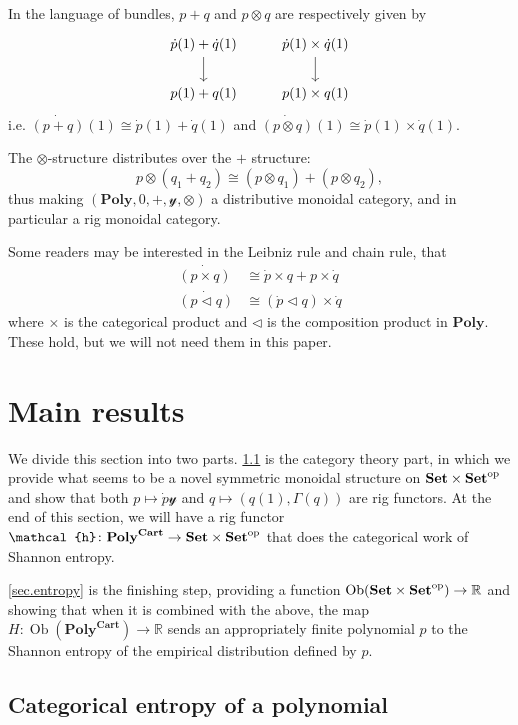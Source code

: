\documentclass[11pt, one side, article]{memoir}
\theoremstyle{definition}
\theoremstyle{plain}
\newenvironment{remark}
  {\pushQED{\qed}\renewcommand{\qedsymbol}{$\lozenge$}\remarkx}
  {\popQED\endremarkx}
\DeclareMathOperator{\ob}{Ob}
\newcommand{\Cat}[1]{\mathbf{#1}}%
\newcommand{\op}{^\tn{op}}
\newcommand{\tn}[1]{\textnormal{#1}}
\newcommand{\rr}{\mathbb{R}}
\newcommand{\smset}{\Cat{Set}}
\newcommand{\yon}{\mathcal{y}}
\newcommand{\poly}{\Cat{Poly}}
\newcommand{\polycart}{\poly^{\Cat{Cart}}}
\newcommand{\hh}{\mathcal{h}}
\newcommand{\0}{\textsf{0}}
\newcommand{\1}{\tn{\textsf{1}}}
\newcommand{\tri}{\mathbin{\triangleleft}}
\begin{document}
In the language of bundles, $p+q$ and $p\otimes q$ are respectively given by
\[
\begin{tikzcd}
	\dot{p}(1)+\dot{q}(1)\ar[d]&\dot{p}(1)\times\dot{q}(1)\ar[d]\\
	p(1)+q(1)&p(1)\times q(1)
\end{tikzcd}
\]
i.e. $\dot{(p+q)}(1)\cong\dot{p}(1)+\dot{q}(1)$ and $\dot{(p\otimes q)}(1)\cong\dot{p}(1)\times\dot{q}(1)$.

The $\otimes$-structure distributes over the $+$ structure:
\[
p\otimes (q_1+q_2)\cong (p\otimes q_1)+(p\otimes q_2),
\]
thus making $(\poly,0,+,\yon,\otimes)$ a distributive monoidal category, and in particular a rig monoidal category.

\begin{remark}[Leibniz and chain rules]\label{rem.leibniz}
Some readers may be interested in the Leibniz rule and chain rule, that
\begin{align*}
	\dot{(p\times q)}&\cong\dot{p}\times q+p\times\dot{q}\\
	\dot{(p\tri q)}&\cong(\dot{p}\tri q)\times\dot{q}
\end{align*}
where $\times$ is the categorical product and $\tri$ is the composition product in $\poly$. These hold, but we will not need them in this paper.
\end{remark}

\chapter{Main results}\label{chap.main}

We divide this section into two parts. \cref{sec.CT} is the category theory part, in which we provide what seems to be a novel symmetric monoidal structure on $\smset\times\smset\op$ and show that both $p\mapsto\dot{p}\yon$ and $q\mapsto(q(1),\Gamma(q))$ are rig functors. At the end of this section, we will have a rig functor $\hh\colon\polycart\to\smset\times\smset\op$ that does the categorical work of Shannon entropy.

\cref{sec.entropy} is the finishing step, providing a function $\ob(\smset\times\smset\op)\to\rr$ and showing that when it is combined with the above, the map $H\colon\ob(\polycart)\to\rr$ sends an appropriately finite polynomial $p$ to the Shannon entropy of the empirical distribution defined by $p$.

\section{Categorical entropy of a polynomial}\label{sec.CT}
\end{document}
